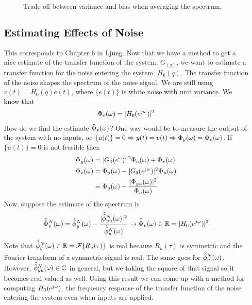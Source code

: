 \documentclass[lecture,12pt,]{pcms-l}
\begin{document}
\begin{figure}[ht!]
  \centering
   \hfill
   \hfill
  \caption{Trade-off between variance and bias when averaging the spectrum.}
  \label{fig:07tradeoff}
\end{figure}

\subsection{Estimating Effects of Noise}
This corresponds to Chapter 6 in Ljung. Now that we have a method to get a nice estimate of the transfer function of the system, $G_(q)$, we want to estimate a transfer function for the noise entering the system, $H_0(q)$. The transfer function of the noise shapes the spectrum of the noise signal. We are still using $v(t) = H_0(q)e(t)$, where $\{e(t)\}$ is white noise with unit variance. We know that
$$\Phi_v(\omega) = |H_0(e^{j\omega})|^2$$
How do we find the estimate $\hat{\Phi}_v(\omega)$? One way would be to measure the output of the system with no inputs, or $\{u(t)\}=0 \Rightarrow y(t) = v(t) \Rightarrow \Phi_y(\omega) = \Phi_v(\omega)$. If $\{u(t)\}=0$ is not feasible then
\begin{align*}
\Phi_y(\omega) &= |G_0(e^{\omega})``^2\Phi_u(\omega) + \Phi_v(\omega) \\
\Phi_v(\omega) &= \Phi_y(\omega) - |G_0(e^{j\omega})|^2\Phi_u(\omega) \\
&= \Phi_y(\omega) - \frac{|\Phi_{yu}(\omega)|^2}{\Phi_u(\omega)}
\end{align*}
Now, suppose the estimate of the spectrum is
\begin{align*}
\hat{\hat{\Phi}}_v^N(\omega) = \hat{\hat{\phi}}_y^N(\omega) - \frac{|\hat{\hat{\phi}}_{yu}^N(\omega)|^2}{\hat{\hat{\phi}}_u^N(\omega)} \to \hat{\hat{\Phi}}_v(\omega)\in\mathbb{R} = |H_0(e^{j\omega})|^2
\end{align*}
Note that $\hat{\hat{\phi}}_y^N(\omega)\in\mathbb{R} = \mathcal{F}\{R_u(\tau)\}$ is real because $R_u(\tau)$ is symmetric and the Fourier transform of a symmetric signal is real. The same goes for $\hat{\hat{\phi}}_u^N(\omega)$. However, $\hat{\hat{\phi}}_{yu}^N(\omega)\in\mathbb{C}$ in general, but we taking the square of that signal so it becomes real-valued as well. Using this result we can come up with a method for computing $H_0(e^{j\omega})$, the frequency response of the transfer function of the noise entering the system even when inputs are applied.
\end{document}
